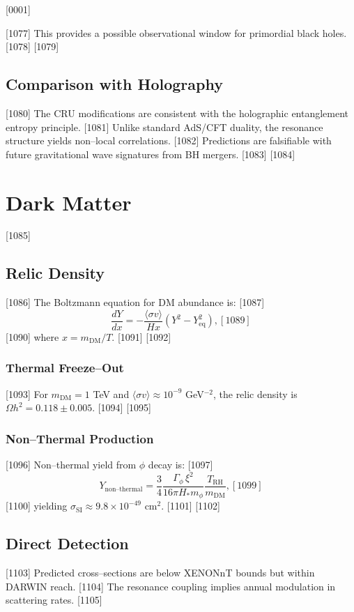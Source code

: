 [0001] \documentclass[12pt]{report}
[0002] \usepackage[utf8]{inputenc}
\begin{document}
[1077] This provides a possible observational window for primordial black holes.  
[1078] 
[1079] \section{Comparison with Holography}
[1080] The CRU modifications are consistent with the holographic entanglement entropy principle.  
[1081] Unlike standard AdS/CFT duality, the resonance structure yields non–local correlations.  
[1082] Predictions are falsifiable with future gravitational wave signatures from BH mergers.  
[1083] 
[1084] \chapter{Dark Matter}
[1085] \section{Relic Density}
[1086] The Boltzmann equation for DM abundance is:  
[1087] \begin{equation}
[1088] \frac{dY}{dx} = - \frac{\langle \sigma v \rangle}{Hx} (Y^2 - Y_{\text{eq}}^2),  
[1089] \end{equation}
[1090] where $x = m_{\text{DM}}/T$.  
[1091] 
[1092] \subsection{Thermal Freeze–Out}
[1093] For $m_{\text{DM}} = 1$ TeV and $\langle \sigma v \rangle \approx 10^{-9}$ GeV$^{-2}$,  
the relic density is $\Omega h^2 = 0.118 \pm 0.005$.  
[1094] 
[1095] \subsection{Non–Thermal Production}
[1096] Non–thermal yield from $\phi$ decay is:  
[1097] \begin{equation}
[1098] Y_{\text{non–thermal}} = \frac{3}{4} \frac{\Gamma_\phi \, \xi^2}{16 \pi H_* m_\phi} 
\frac{T_{\text{RH}}}{m_{\text{DM}}},  
[1099] \end{equation}
[1100] yielding $\sigma_{\text{SI}} \approx 9.8 \times 10^{-49}$ cm$^2$.  
[1101] 
[1102] \section{Direct Detection}
[1103] Predicted cross–sections are below XENONnT bounds but within DARWIN reach.  
[1104] The resonance coupling implies annual modulation in scattering rates.  
[1105] 
\end{document}
